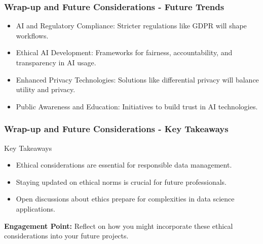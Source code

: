 \documentclass[aspectratio=169]{beamer}
\begin{document}
\begin{frame}[fragile]
    \frametitle{Wrap-up and Future Considerations - Future Trends}
    
    \begin{itemize}
        \item AI and Regulatory Compliance: Stricter regulations like GDPR will shape workflows.
        \item Ethical AI Development: Frameworks for fairness, accountability, and transparency in AI usage.
        \item Enhanced Privacy Technologies: Solutions like differential privacy will balance utility and privacy.
        \item Public Awareness and Education: Initiatives to build trust in AI technologies.
    \end{itemize}
\end{frame}

\begin{frame}[fragile]
    \frametitle{Wrap-up and Future Considerations - Key Takeaways}
    
    \begin{block}{Key Takeaways}
        \begin{itemize}
            \item Ethical considerations are essential for responsible data management.
            \item Staying updated on ethical norms is crucial for future professionals.
            \item Open discussions about ethics prepare for complexities in data science applications.
        \end{itemize}
    \end{block}
    
    \textbf{Engagement Point:} Reflect on how you might incorporate these ethical considerations into your future projects.
\end{frame}
\end{document}
